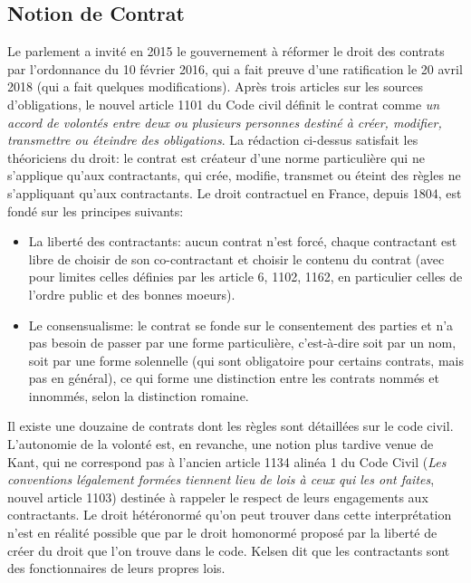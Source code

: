 \documentclass[math]{cours}
\begin{document}
\subsection{Notion de Contrat}
Le parlement a invité en 2015 le gouvernement à réformer le droit des contrats par l'ordonnance du 10 février 2016, qui a fait preuve d'une ratification le 20 avril 2018 (qui a fait quelques modifications).
Après trois articles sur les sources d'obligations, le nouvel article 1101 du Code civil définit le contrat comme \emph{un accord de volontés entre deux ou plusieurs personnes destiné à créer, modifier, transmettre ou éteindre des obligations}.
La rédaction ci-dessus satisfait les théoriciens du droit: le contrat est créateur d'une norme particulière qui ne s'applique qu'aux contractants, qui crée, modifie, transmet ou éteint des règles ne s'appliquant qu'aux contractants.
Le droit contractuel en France, depuis 1804, est fondé sur les principes suivants:
\begin{itemize}
	\item La liberté des contractants: aucun contrat n'est forcé, chaque contractant est libre de choisir de son co-contractant et choisir le contenu du contrat (avec pour limites celles définies par les article 6, 1102, 1162, en particulier celles de l'ordre public et des bonnes moeurs).
	\item Le consensualisme: le contrat se fonde sur le consentement des parties et n'a pas besoin de passer par une forme particulière, c'est-à-dire soit par un nom, soit par une forme solennelle (qui sont obligatoire pour certains contrats, mais pas en général), ce qui forme une distinction entre les contrats nommés et innommés, selon la distinction romaine.
\end{itemize}
Il existe une douzaine de contrats dont les règles sont détaillées sur le code civil.
L'autonomie de la volonté est, en revanche, une notion plus tardive venue de Kant, qui ne correspond pas à l'ancien article 1134 alinéa 1 du Code Civil (\emph{Les conventions légalement formées tiennent lieu de lois à ceux qui les ont faites}, nouvel article 1103) destinée à rappeler le respect de leurs engagements aux contractants.
Le droit hétéronormé qu'on peut trouver dans cette interprétation n'est en réalité possible que par le droit homonormé proposé par la liberté de créer du droit que l'on trouve dans le code.
Kelsen dit que les contractants sont des fonctionnaires de leurs propres lois.
\end{document}
